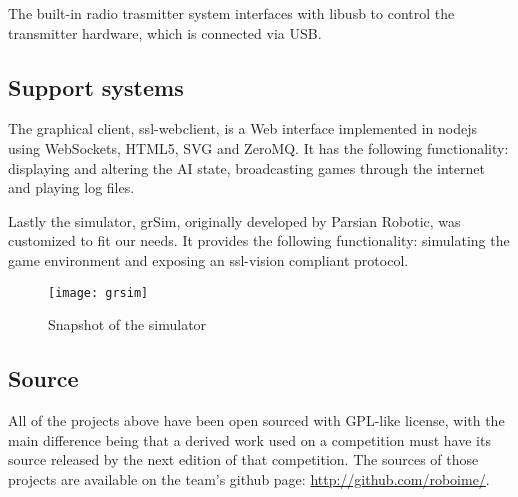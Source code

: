 The built-in radio trasmitter system interfaces with libusb to control the transmitter hardware, which is connected via USB.


\subsection{Support systems}

The graphical client, ssl-webclient, is a Web interface implemented in nodejs
using WebSockets, HTML5, SVG and ZeroMQ\@.
It has the following functionality: displaying and altering the AI state,
broadcasting games through the internet and playing log files.

Lastly the simulator, grSim, originally developed by Parsian Robotic, was
customized to fit our needs.
It provides the following functionality: simulating the game environment and
exposing an ssl-vision compliant protocol.

\begin{figure}[H]
     \centering
     \texttt{[image: grsim]}
     \caption{Snapshot of the simulator}
     \label{fig:grsim}
\end{figure}

\subsection{Source}

All of the projects above have been open sourced with GPL-like license, with
the main difference being that a derived work used on a competition must have
its source released by the next edition of that competition. The sources of
those projects are available on the team's github page:
\url{http://github.com/roboime/}.

